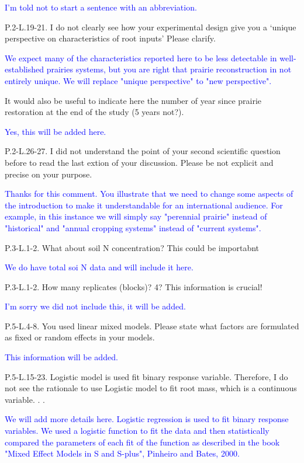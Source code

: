 \documentclass[]{article}
\begin{document}
\textcolor{blue}{I'm told not to start a sentence with an abbreviation.}

P.2-L.19-21. I do not clearly see how your experimental design give you
a `unique perspective on characteristics of root inputs' Please clarify.

\textcolor{blue}{We expect many of the characteristics reported here to be less detectable in well-established prairies systems, but you are right that prairie reconstruction in not entirely unique. We will replace "unique perspective" to "new perspective".}

It would also be useful to indicate here the number of year since
prairie restoration at the end of the study (5 years not?).

\textcolor{blue}{Yes, this will be added here.}

P.2-L.26-27. I did not understand the point of your second scientific
question before to read the last extion of your discussion. Please be
not explicit and precise on your purpose.

\textcolor{blue}{Thanks for this comment. You illustrate that we need to change some aspects of the introduction to make it understandable for an international audience. For example, in this instance we will simply say "perennial prairie" instead of "historical" and "annual cropping systems" instead of "current systems".}

P.3-L.1-2. What about soil N concentration? This could be importabnt

\textcolor{blue}{We do have total soi N data and will include it here.}

P.3-L.1-2. How many replicates (blocks)? 4? This information is crucial!

\textcolor{blue}{I'm sorry we did not include this, it will be added.}

P.5-L.4-8. You used linear mixed models. Please state what factors are
formulated as fixed or random effects in your models.

\textcolor{blue}{This information will be added.}

P.5-L.15-23. Logistic model is used fit binary response variable.
Therefore, I do not see the rationale to use Logistic model to fit root
mass, which is a continuous variable. . .

\textcolor{blue}{We will add more details here. Logistic regression is used to fit binary response variables. We used a logistic function to fit the data and then statistically compared the parameters of each fit of the function as described in the book "Mixed Effect Models in S and S-plus", Pinheiro and Bates, 2000.}
\end{document}
